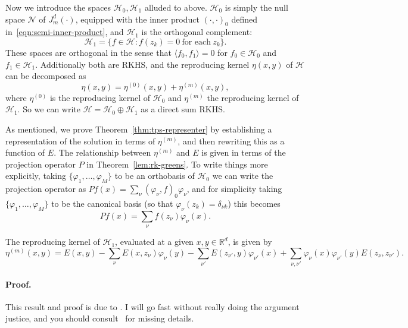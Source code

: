 \documentclass{article}
\newcommand{\dotp}[2]{\langle #1, #2 \rangle}
\newcommand{\mc}[1]{\mathcal{#1}}
\newcommand{\Reals}{\mathbb{R}} %
\newcommand{\Rd}{\Reals^d}
\newcommand{\1}{\mathbf{1}}
\begin{document}
Now we introduce the spaces $\mc{H}_0, \mc{H}_1$ alluded to above. $\mc{H}_0$ is simply the null space $\mc{N}$ of $J_m^d(\cdot)$, equipped with the inner product $(\cdot,\cdot)_0$ defined in~\eqref{eqn:semi-inner-product}, and $\mc{H}_1$ is the orthogonal complement:
$$\mc{H}_1 = \bigl\{f \in \mc{H}: f(z_k) = 0~\textrm{for each}~z_k\bigr\}.$$
These spaces are orthogonal in the sense that $\dotp{f_0}{f_1} = 0$ for $f_0 \in \mc{H}_0$ and $f_1 \in \mc{H}_1$. Additionally both are RKHS, and the reproducing kernel $\eta(x,y)$ of $\mc{H}$ can be decomposed as
\begin{equation*}
\eta(x,y) = \eta^{(0)}(x,y) + \eta^{(m)}(x,y),
\end{equation*}
where $\eta^{(0)}$ is the reproducing kernel of $\mc{H}_0$ and $\eta^{(m)}$ the reproducing kernel of $\mc{H}_1$. So we can write $\mc{H} = \mc{H}_0 \oplus \mc{H}_1$ as a direct sum RKHS.

As mentioned, we prove Theorem~\ref{thm:tps-representer} by establishing a representation of the solution in terms of $\eta^{(m)}$, and then rewriting this as a function of $E$. The relationship between $\eta^{(m)}$ and $E$ is given in terms of the projection operator $P$ in Theorem~\ref{lem:rk-greens}. To write things more explicitly, taking $\{\varphi_1,\ldots,\varphi_M\}$ to be an orthobasis of $\mc{H}_0$ we can write the projection operator as $Pf(x) = \sum_{\nu} (\varphi_{\nu},f)_0 \varphi_{\nu}$, and for simplicity taking $\{\varphi_1,\ldots,\varphi_M\}$ to be the canonical basis (so that $\varphi_{\nu}(z_k) = \delta_{\nu k}$) this becomes
\begin{equation*}
Pf(x) = \sum_{\nu} f(z_{\nu}) \varphi_{\nu}(x).
\end{equation*}

\begin{theorem}
	\label{lem:rk-greens}
	The reproducing kernel of $\mc{H}_1$, evaluated at a given $x,y \in \Rd$, is given by
	\begin{equation}
	\label{eqn:rk}
	\eta^{(m)}(x,y) = E(x,y) - \sum_{\nu} E(x,z_{\nu}) \varphi_{\nu}(y) - \sum_{\nu'} E(z_{\nu'},y) \varphi_{\nu'}(x) + \sum_{\nu,\nu'} \varphi_{\nu}(x) \varphi_{\nu'}(y) E(z_{\nu},z_{\nu'}).
	\end{equation}
\end{theorem}

\paragraph{Proof.}
This result and proof is due to \citet{meinguet1979multivariate}. I will go fast without really doing the argument justice, and you should consult~\citet{meinguet1979multivariate} for missing details.
\end{document}
